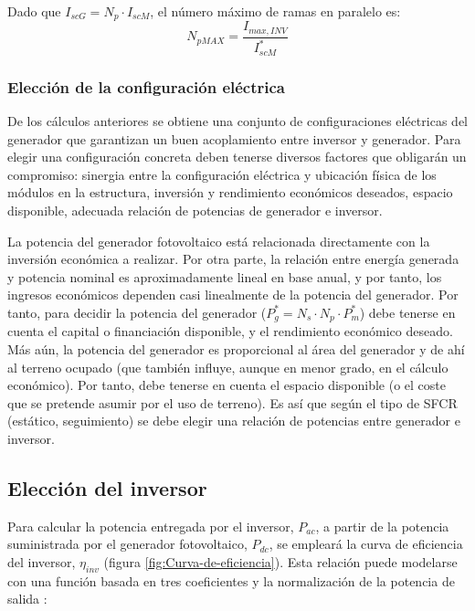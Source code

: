 Dado que $I_{scG}=N_p \cdot I_{scM}$, el número máximo de ramas en
paralelo es:
\begin{equation}
  \label{eq:NpMAX}
  N_{pMAX}=\frac{I_{max,INV}}{I_{scM}^{*}}
\end{equation}


\subsubsection{Elección de la configuración eléctrica}

De los cálculos anteriores se obtiene una conjunto de configuraciones eléctricas
del generador que garantizan un buen acoplamiento entre inversor y
generador. Para elegir una configuración concreta deben tenerse diversos
factores que obligarán un compromiso: sinergia entre la configuración
eléctrica y ubicación física de los módulos en la estructura, inversión
y rendimiento económicos deseados, espacio disponible, adecuada relación
de potencias de generador e inversor.

La potencia del generador fotovoltaico está relacionada directamente
con la inversión económica a realizar. Por otra parte, la relación
entre energía generada y potencia nominal es aproximadamente lineal
en base anual, y por tanto, los ingresos económicos dependen casi
linealmente de la potencia del generador. Por tanto, para decidir
la potencia del generador ($P_{g}^{*}=N_{s}\cdot N_{p}\cdot
P_{m}^{*}$)
debe tenerse en cuenta el capital o financiación disponible, y el
rendimiento económico deseado. Más aún, la potencia del generador
es proporcional al área del generador y de ahí al terreno ocupado
(que también influye, aunque en menor grado, en el cálculo económico).
Por tanto, debe tenerse en cuenta el espacio disponible (o el coste
que se pretende asumir por el uso de terreno). Es así que según el
tipo de SFCR (estático, seguimiento) se debe elegir una relación de
potencias entre generador e inversor. 


\subsection{Elección del inversor}

Para calcular la potencia entregada por el inversor, $P_{ac}$,
a partir de la potencia suministrada por el generador fotovoltaico,
$P_{dc}$, se empleará la curva de eficiencia del inversor, $\eta_{inv}$
(figura \ref{fig:Curva-de-eficiencia}). Esta relación puede modelarse
con una función basada en tres coeficientes y la normalización de
la potencia de salida \citep{Jantsch.Schmidt.ea1992}:


